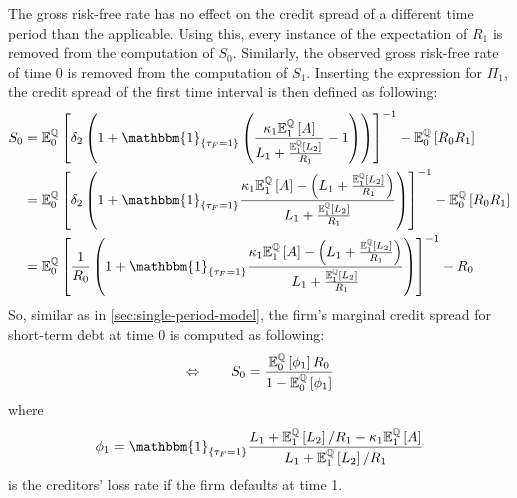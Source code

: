 \documentclass[main.tex]{subfiles}
\begin{document}
        The gross risk-free rate has no effect on the credit spread of a different time period than the applicable.
        Using this, every instance of the expectation of $R_1$ is removed from the computation of $S_0$.
        Similarly, the observed gross risk-free rate of time 0 is removed from the computation of $S_1$.
        Inserting the expression for $\Pi_1$, the credit spread of the first time interval is then defined as following: 
        \begin{align}
            S_0 &=
            \mathbb{E}_{0}^{\rnmeasure}\left[
                \delta_2\left(
                    1
                    + \mathbbm{1}_{\{\tau_{F} = 1\}}\left(
                        \frac{\kappa_1 \mathbb{E}_{1}^{\rnmeasure}\left[A\right]}{L_1 + \frac{\mathbb{E}_{1}^{\rnmeasure}\left[L_2\right]}{R_1}} - 1
                    \right)
                \right)
            \right]^{-1} - \mathbb{E}_{0}^{\rnmeasure}\left[R_0 R_1\right]
            \nonumber
            \\
            &=
            \mathbb{E}_{0}^{\rnmeasure}\left[
                \delta_2 \left(
                    1
                    + \mathbbm{1}_{\{\tau_{F} = 1\}}
                    \frac{
                        \kappa_1 \mathbb{E}_{1}^{\rnmeasure}\left[A\right] - \left(L_1 + \frac{\mathbb{E}_{1}^{\rnmeasure}\left[L_2\right]}{R_1}\right)
                    }{
                        L_1 + \frac{\mathbb{E}_{1}^{\rnmeasure}\left[L_2\right]}{R_1}
                    }
                \right)
            \right]^{-1} - \mathbb{E}_{0}^{\rnmeasure}\left[R_0 R_1\right]
            \nonumber
            \\
            &=
            \mathbb{E}_{0}^{\rnmeasure}\left[
                \frac{1}{R_0} \left(
                    1
                    + \mathbbm{1}_{\{\tau_{F} = 1\}}
                    \frac{
                        \kappa_1 \mathbb{E}_{1}^{\rnmeasure}\left[A\right] - \left(L_1 + \frac{\mathbb{E}_{1}^{\rnmeasure}\left[L_2\right]}{R_1}\right)
                    }{
                        L_1 + \frac{\mathbb{E}_{1}^{\rnmeasure}\left[L_2\right]}{R_1}
                    }
                \right)
            \right]^{-1} - R_0
            \nonumber
        \end{align}
        So, similar as in \cref{sec:single-period-model}, the firm's marginal credit spread for short-term debt at time 0 is computed as following:
        \begin{equation}
            \Leftrightarrow \qquad
            S_0 =
            \frac{
                \mathbb{E}_{0}^{\mathbb{Q}}\left[\phi_1\right]R_0
            }{
                1 - \mathbb{E}_{0}^{\mathbb{Q}}\left[\phi_1\right] 
            }
        \end{equation}
        where
        \begin{equation}
            \phi_1 =
            \mathbbm{1}_{\{\tau_{F}=1\}}
            \frac{
                L_{1}+\mathbb{E}_{1}^{\rnmeasure}\left[L_{2}\right]/R_1 - \kappa_{1}\mathbb{E}_{1}^{\rnmeasure}\left[A\right]
            }{
                L_{1} + \mathbb{E}_{1}^{\rnmeasure}\left[L_{2}\right]/R_1
            }
        \end{equation}
        is the creditors' loss rate if the firm defaults at time 1.
        
\end{document}

